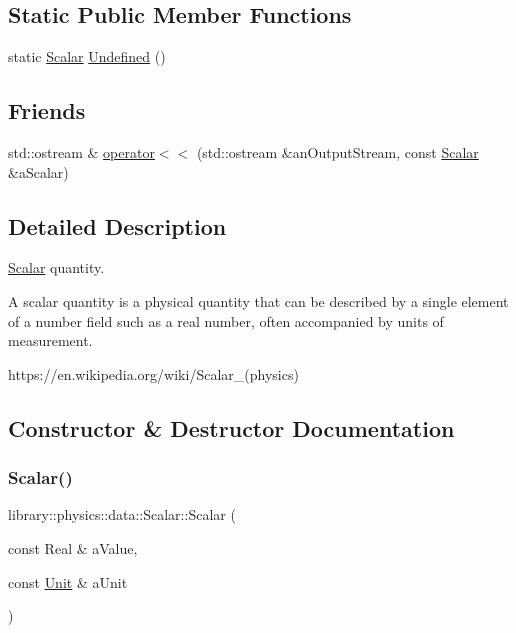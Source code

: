 \subsection*{Static Public Member Functions}
\begin{DoxyCompactItemize}
\item 
static \hyperlink{classlibrary_1_1physics_1_1data_1_1_scalar}{Scalar} \hyperlink{classlibrary_1_1physics_1_1data_1_1_scalar_ae95aa684ba447a0c6430d6cc310c7926}{Undefined} ()
\end{DoxyCompactItemize}
\subsection*{Friends}
\begin{DoxyCompactItemize}
\item 
std\+::ostream \& \hyperlink{classlibrary_1_1physics_1_1data_1_1_scalar_ac5e6ec203257e2dbec9f528ff111aa52}{operator$<$$<$} (std\+::ostream \&an\+Output\+Stream, const \hyperlink{classlibrary_1_1physics_1_1data_1_1_scalar}{Scalar} \&a\+Scalar)
\end{DoxyCompactItemize}


\subsection{Detailed Description}
\hyperlink{classlibrary_1_1physics_1_1data_1_1_scalar}{Scalar} quantity. 

A scalar quantity is a physical quantity that can be described by a single element of a number field such as a real number, often accompanied by units of measurement.

https\+://en.wikipedia.\+org/wiki/\+Scalar\+\_\+(physics) 

\subsection{Constructor \& Destructor Documentation}
\mbox{\label{classlibrary_1_1physics_1_1data_1_1_scalar_a74eb4ae24361e598b0c6dba07e07e0ab}} 
\subsubsection{\texorpdfstring{Scalar()}{Scalar()}}
{\footnotesize\ttfamily library\+::physics\+::data\+::\+Scalar\+::\+Scalar (\begin{DoxyParamCaption}\item[{const Real \&}]{a\+Value,  }\item[{const \hyperlink{classlibrary_1_1physics_1_1_unit}{Unit} \&}]{a\+Unit }\end{DoxyParamCaption})}



